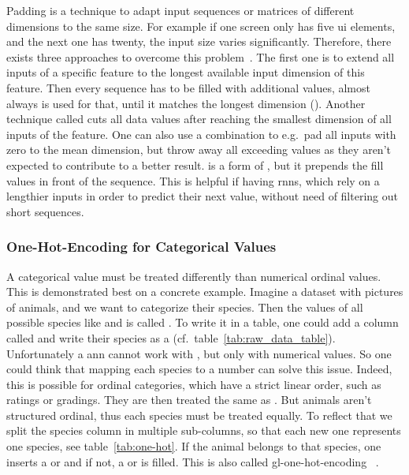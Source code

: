Padding is a technique to adapt input sequences or matrices of different dimensions to the same size.
For example if one screen only has five \gls{ui} elements, and the next one has twenty, the input size varies significantly.
Therefore, there exists three approaches to overcome this problem~\cite{baeldung_padding}.
The first one is to extend all inputs of a specific feature to the longest available input dimension of this feature.
Then every sequence has to be filled with additional values, almost always  is used for that, until it matches the longest dimension ().
Another technique called  cuts all data values after reaching the smallest dimension of all inputs of the feature.
One can also use a combination to e.g.\ pad all inputs with zero to the mean dimension, but throw away all exceeding values as they aren't expected to contribute to a better result.
 is a form of , but it prepends the fill values in front of the sequence.
This is helpful if having \gls{rnn}s, which rely on a lengthier inputs in order to predict their next value, without need of filtering out short sequences.

\subsubsection{One-Hot-Encoding for Categorical Values}
\label{subsubsec:categorical_variables}

A categorical value must be treated differently than numerical ordinal values.
This is demonstrated best on a concrete example.
Imagine a dataset with pictures of animals, and we want to categorize their species.
Then the values of all possible species like  and  is called .
To write it in a table, one could add a column called  and write their species as a  (cf.\ table~\ref{tab:raw_data_table}).
Unfortunately a \gls{ann} cannot work with , but only with numerical values.
So one could think that mapping each species to a number can solve this issue.
Indeed, this is possible for ordinal categories, which have a strict linear order, such as ratings or gradings.
They are then treated the same as .
But animals aren't structured ordinal, thus each species must be treated equally.
To reflect that we split the species column in multiple sub-columns, so that each new one represents one species, see table~\ref{tab:one-hot}.
If the animal belongs to that species, one inserts a  or  and if not, a  or  is filled.
This is also called \gls{gl-one-hot}-encoding ~\cite{brownlee2021}.

